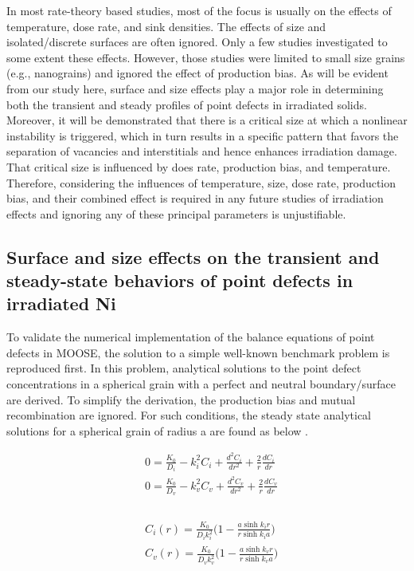 \documentclass[utf8]{frontiersSCNS} %
\begin{document}
    In most rate-theory based studies, most of the focus is usually on the effects of temperature, dose rate, and sink densities. The effects of size and isolated/discrete surfaces are often ignored. Only a few studies \citep{yang2010,demkowicz2011} investigated to some extent these effects. However, those studies were limited to small size grains (e.g., nanograins) and ignored the effect of production bias. As will be evident from our study here, surface and size effects play a major role in determining both the transient and steady profiles of point defects in irradiated solids. Moreover, it will be demonstrated that there is a critical size at which a nonlinear instability is triggered, which in turn results in a specific pattern that favors the separation of vacancies and interstitials and hence enhances irradiation damage. That critical size is influenced by does rate, production bias, and temperature. Therefore, considering the influences of temperature, size, dose rate, production bias, and their combined effect is required in any future studies of irradiation effects and ignoring any of these principal parameters is unjustifiable.\\

\subsection{Surface and size effects on the transient and steady-state behaviors of point defects in irradiated Ni}

To validate the numerical implementation of the balance equations of point defects in MOOSE, the solution to a simple well-known benchmark problem is reproduced first. In this problem, analytical solutions to the point defect concentrations in a spherical grain with a perfect and neutral boundary/surface are derived. To simplify the derivation, the production bias and mutual recombination are ignored. For such conditions, the steady state analytical solutions for a spherical grain of radius a are found as below \citep{heald1977}.

    \begin{equation}
        \begin{aligned}
          &0 = \frac{K_0}{D_i} - k_i^2C_i + \frac{d^2C_i}{dr^2}+\frac{2}{r}\frac{dC_i}{dr}\\
          &0 = \frac{K_0}{D_v} - k_v^2C_v + \frac{d^2C_v}{dr^2}+\frac{2}{r}\frac{dC_v}{dr}\\
        \end{aligned}
        \label{equation:spherical_norecomb_point_defect_equations}
    \end{equation}
    \\
    \begin{equation}
        \begin{aligned}
          &C_i(r)=\frac{K_0}{D_ik_i^2}\bigg(1-\frac{a\sinh{k_ir}}{r\sinh{k_ia}}\bigg)\\
          &C_v(r)=\frac{K_0}{D_vk_v^2}\bigg(1-\frac{a\sinh{k_vr}}{r\sinh{k_va}}\bigg)\\
        \end{aligned}
        \label{equation:spherical_grain_analytical_solution}
    \end{equation}
 
\end{document}
